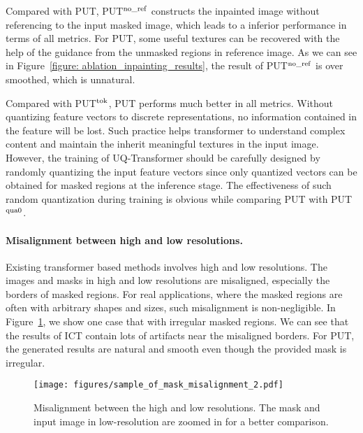 \documentclass[10pt,twocolumn,letterpaper]{article}
\newcommand{\Fref}[1]{Figure~\ref{#1}}
\begin{document}
Compared with PUT, PUT$^{\rm no\_ref}$ constructs the inpainted image without referencing to the input masked image, which leads to a inferior performance in terms of all metrics. For PUT, some useful textures can be recovered with the help of the guidance from the unmasked regions in reference image. As we can see in \Fref{figure: ablation_inpainting_results}, the result of PUT$^{\rm no\_ref}$ is over smoothed, which is unnatural.

Compared with PUT$^{\rm tok}$, PUT performs much better in all metrics. Without quantizing feature vectors to discrete representations, no information contained in the feature will be lost. Such practice helps transformer to understand complex content and maintain the inherit meaningful textures in the input image. However, the training of UQ-Transformer should be carefully designed by randomly quantizing the input feature vectors since only quantized vectors can be obtained for masked regions at the inference stage. The effectiveness of such random quantization during training is obvious while comparing PUT with PUT$^{\rm qua0}$.

\paragraph{Misalignment between high and low resolutions.} Existing transformer based methods \cite{wan2021high} involves high and low resolutions. 
The images and masks in high and low resolutions are misaligned, especially the borders of masked regions. For real applications, where the masked regions are often with arbitrary shapes and sizes, such misalignment is non-negligible. In \Fref{figure: misalignment_between_high_and_low_resolution}, we show one case that with irregular masked regions. We can see that the results of ICT \cite{wan2021high} contain lots of artifacts near the misaligned borders. For PUT, the generated results are natural and smooth even though the provided mask is irregular. 



\begin{figure}[t]
	\centering
	\texttt{[image: figures/sample\_of\_mask\_misalignment\_2.pdf]} 
	\vspace{-15pt}
	\caption{Misalignment between the high and low resolutions. The mask and input image in low-resolution are zoomed in for a better comparison.}
	\vspace{-10pt}
	\label{figure: misalignment_between_high_and_low_resolution}
\end{figure}
\end{document}
